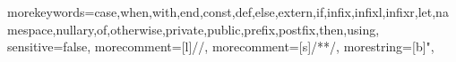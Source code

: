 

\usepackage{a4wide}

\sloppy


\usepackage{mathpazo}

\usepackage[T1]{fontenc}
\usepackage{textcomp}
\usepackage[scaled=0.86]{beramono}

\usepackage{sectsty}

\usepackage[titles]{tocloft}
\renewcommand{\cftsecfont}{\usefont{OT1}{phv}{bc}{n}}
\setlength{\cftsubsecnumwidth}{2.5em}

\usepackage{listings}
{morekeywords={case,when,with,end,const,def,else,extern,if,infix,infixl,infixr,let,namespace,nullary,of,otherwise,private,public,prefix,postfix,then,using},
 sensitive=false,
 morecomment=[l]{//},
 morecomment=[s]{/*}{*/},
 morestring=[b]",
}
\lstset{language=pure,columns=flexible}
\lstset{basicstyle=\ttfamily,keepspaces=true,commentstyle=}

\usepackage[breaklinks]{hyperref}
\hypersetup{bookmarksnumbered,pdfborder=0 0 0}

\makeatletter
\newcommand{\plain@href}{}
\let\plain@href\href
\newcommand{\fancy@href}[2]{\plain@href{#1}{$\triangleright$\emph{#2}}}
\newcommand{\fancyhref}{\let\href\fancy@href}
\newcommand{\plainhref}{\let\href\plain@href}
\fancyhref
\makeatother

\renewenvironment{optionlist}[1]
{\begin{list}{}{\renewcommand{\makelabel}{\optionlistlabel}}}{\end{list}}
\renewcommand{\optionlistlabel}[1]{\texttt{\textbf{#1}} \hfill}
